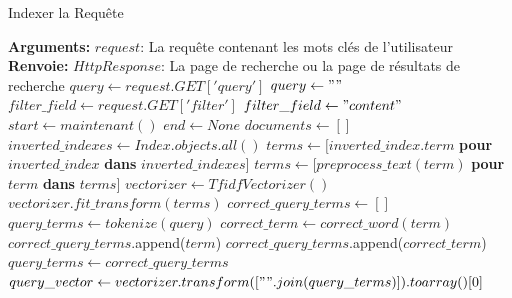     \begin{algorithm}
        \caption{Indexer la Requête}
        \begin{algorithmic}[1]
            \State
            \State \textbf{Arguments:}
            \State $request$: La requête contenant les mots clés de l'utilisateur
            \State
            \State \textbf{Renvoie:}
            \State $HttpResponse$: La page de recherche ou la page de résultats de recherche
            \State
                \State $query \gets request.GET['query']$
            \Else
                \State $query \gets ""$
            \EndIf
            \State
                \State $filter\_field \gets request.GET['filter']$
            \Else
                \State $filter\_field \gets "content"$
            \EndIf
            \State
                \State $start \gets maintenant()$
                \State $end \gets None$
                \State $documents \gets []$
                \State
                \State $inverted\_indexes \gets Index.objects.all()$
                \State
                    \State $terms \gets [inverted\_index.term$ \textbf{pour} $inverted\_index$ \textbf{dans} $inverted\_indexes]$
                    \State $terms \gets [preprocess\_text(term)$ \textbf{pour} $term$ \textbf{dans} $terms]$
                    \State
                    \State $vectorizer \gets TfidfVectorizer()$
                    \State $vectorizer.fit\_transform(terms)$
                    \State
                    \State $correct\_query\_terms \gets []$
                    \State $query\_terms \gets tokenize(query)$
                    \State
                        \State $correct\_term \gets correct\_word(term)$
                            \State $correct\_query\_terms$.append($term$)
                        \Else
                            \State $correct\_query\_terms$.append($correct\_term$)
                        \EndIf
                    \EndFor
                    \State
                    \State $query\_terms \gets correct\_query\_terms$
                    \State $query\_vector \gets vectorizer.transform([" ".join(query\_terms)]).toarray()[0]$
                    \State

\end{algorithmic}
\end{algorithm}
